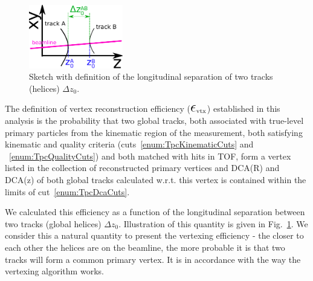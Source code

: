 \begin{figure}\vspace*{-9pt}
  \centering
  \includegraphics[width=0.365\textwidth]{graphics/corrections/deltaZ0Definition2.pdf}
  \caption[Sketch with definition of $\Delta z_{0}$.]
   {Sketch with definition of the longitudinal separation of two tracks (helices) $\Delta z_{0}$.}
   \label{fig:deltaZ0Sketch}\vspace*{-9pt} 
\end{figure}

The definition of vertex reconstruction efficiency ($\mbox{\LARGE$\epsilon$}_{\text{vtx}}$) established in this analysis is the probability that two global tracks, both associated with true-level primary particles from the kinematic region of the measurement, both satisfying kinematic and quality criteria (cuts~\ref{enum:TpcKinematicCuts} and ~\ref{enum:TpcQualityCuts}) and both matched with hits in TOF, form a vertex listed in the collection of reconstructed primary vertices and DCA(R) and DCA(z) of both global tracks calculated w.r.t. this vertex is contained within the limits of cut~\ref{enum:TpcDcaCuts}.

We calculated this efficiency as a function of the longitudinal separation between two tracks (global helices) $\Delta z_{0}$. Illustration of this quantity is given in Fig.~\ref{fig:deltaZ0Sketch}. We consider this a natural quantity to present the vertexing efficiency - the closer to each other the helices are on the beamline, the more probable it is that two tracks will form a common primary vertex. It is in accordance with the way the vertexing algorithm works.



